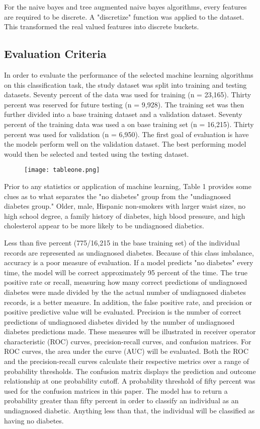 \documentclass[twoside,11pt]{article}
\begin{document}
For the naive bayes and tree augmented naive bayes algorithms, every features are required to be discrete. A "discretize" function was applied to the dataset. This transformed the real valued features into discrete buckets. 

\subsection{Evaluation Criteria}
In order to evaluate the performance of the selected machine learning algorithms on this classification task, the study dataset was split into training and testing datasets. Seventy percent of the data was used for training (n = 23,165). Thirty percent was reserved for future testing (n = 9,928). The training set was then further divided into a base training dataset and a validation dataset. Seventy percent of the training data was used a on base training set (n = 16,215). Thirty percent was used for validation (n = 6,950). The first goal of evaluation is have the models perform well on the validation dataset. The best performing model would then be selected and tested using the testing dataset. 

\begin{figure}[htbp]
  \centering 
  \texttt{[image: tableone.png]} 
  \label{fig:1} 
\end{figure} 

Prior to any statistics or application of machine learning, Table 1 provides some clues as to what separates the "no diabetes" group from the "undiagnosed diabetes group." Older, male, Hispanic non-smokers with larger waist sizes, no high school degree, a family history of diabetes, high blood pressure, and high cholesterol appear to be more likely to be undiagnosed diabetics.  

Less than five percent (775/16,215 in the base training set) of the individual records are represented as undiagnosed diabetes. Because of this class imbalance, accuracy is a poor measure of evaluation. If a model predicts "no diabetes" every time, the model will be correct approximately 95 percent of the time. The true positive rate or recall, measuring how many correct predictions of undiagnosed diabetes were made divided by the the actual number of undiagnosed diabetes records, is a better measure. In addition, the false positive rate, and precision or positive predictive value will be evaluated. Precision is the number of correct predictions of undiagnosed diabetes divided by the number of undiagnosed diabetes predictions made. These measures will be illustrated in receiver operator characteristic (ROC) curves, precision-recall curves, and confusion matrices. For ROC curves, the area under the curve (AUC) will be evaluated. Both the ROC and the precision-recall curves calculate their respective metrics over a range of probability thresholds. The confusion matrix displays the prediction and outcome relationship at one probability cutoff. A probability threshold of fifty percent was used for the confusion matrices in this paper. The model has to return a probability greater than fifty percent in order to classify an individual as an undiagnosed diabetic. Anything less than that, the individual will be classified as having no diabetes.
\end{document}
